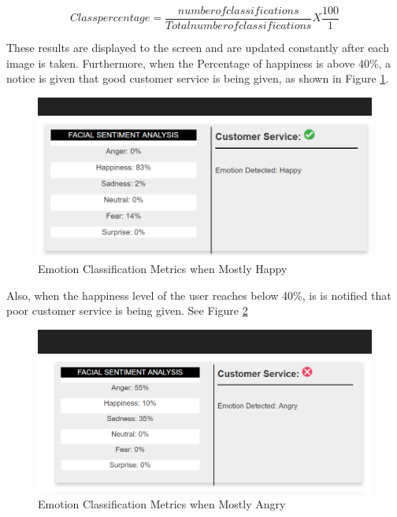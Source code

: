\begin{equation}\label{eq:per}
Class percentage = 
\frac{
	number of classifications
}{
	Total number of classifications
}
X   
\frac{
	100
}{
	1
}
\end{equation}

These results are displayed to the screen and are updated constantly after each image is taken. Furthermore, when the Percentage of happiness is above 40\%, a notice is given that good customer service is being given, as shown in Figure \ref{good}.

\begin{figure}[ht]
	\begin{center}
		\advance\leftskip-3cm
		\advance\rightskip-3cm
		\includegraphics[keepaspectratio=true,scale=0.6]{__resources/implementation/good.png}
		\caption{Emotion Classification Metrics when Mostly Happy}
		\label{good}
	\end{center}
\end{figure}


Also, when the happiness level of the user reaches below 40\%, is is notified that poor customer service is being given. See Figure \ref{bad}

\begin{figure}[ht]
	\begin{center}
		\advance\leftskip-3cm
		\advance\rightskip-3cm
		\includegraphics[keepaspectratio=true,scale=0.6]{__resources/implementation/bad.png}
		\caption{Emotion Classification Metrics when Mostly Angry}
		\label{bad}
	\end{center}
\end{figure}
\newpage

